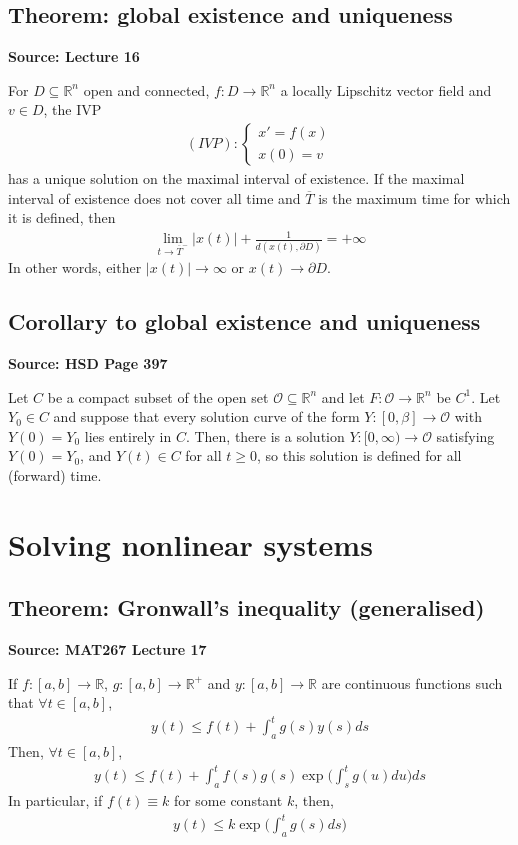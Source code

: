 \documentclass[11pt]{article}
\newcommand{\R}{\mathbb{R}}
\begin{document}
\subsection{Theorem: global existence and uniqueness}
\textbf{Source: Lecture 16}

For $D \subseteq \R^n$ open and connected, $f: D \to \R^n$ a locally Lipschitz vector field and $v \in D$, the IVP 
\begin{align*}
    (IVP): \begin{cases}
    x'= f(x) \\
    x(0) = v
    \end{cases}
\end{align*}
has a unique solution on the maximal interval of existence. If the maximal interval of existence does not cover all time and $\overline{T}$ is the maximum time for which it is defined, then 
\begin{align*}
    \lim_{t \to \overline{T}^-} |x(t)| + \frac{1}{d(x(t), \partial D) } = + \infty
\end{align*}
In other words, either $|x(t)| \to \infty$ or $x(t) \to \partial D$. 

\subsection{Corollary to global existence and uniqueness}
\textbf{Source: HSD Page 397}

Let $C$ be a compact subset of the open set $\mathcal{O} \subseteq \R^n$ and let $F: \mathcal{O} \to \R^n$ be $C^1$. Let $Y_0 \in C$ and suppose that every solution curve of the form $Y: [0, \beta] \to \mathcal{O}$ with $Y(0) = Y_0$ lies entirely in $C$. Then, there is a solution $Y: [0, \infty) \to \mathcal{O}$ satisfying $Y(0) = Y_0$, and $Y(t) \in C$ for all $t \geq 0$, so this solution is defined for all (forward) time. 


\section{Solving nonlinear systems}
\subsection{Theorem: Gronwall's inequality (generalised)}
\textbf{Source: MAT267 Lecture 17}

If $f: [a,b] \to \R$, $g: [a,b] \to \R^+$ and $y: [a,b] \to \R$ are continuous functions such that $\forall t\in [a,b]$, 
\begin{align*}
    y(t) \leq f(t) + \int_a^t g(s) y(s) ds
\end{align*}
Then, $\forall t \in [a,b]$, 
\begin{align*}
    y(t) \leq f(t) + \int_a^t f(s)g(s)\exp\Big(\int_s^t g(u)du\Big) ds
\end{align*}
In particular, if $f(t) \equiv k$ for some constant $k$, then, 
\begin{align*}
    y(t) \leq k \exp\Big(\int_a^t g(s) ds \Big) 
\end{align*}
\end{document}
